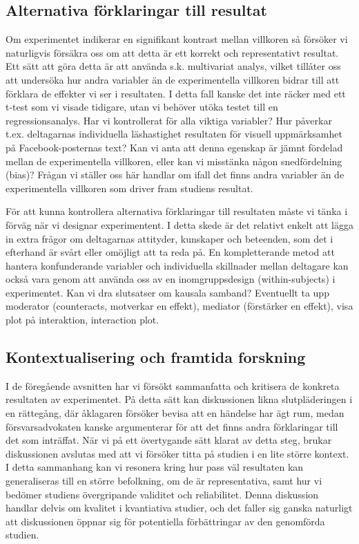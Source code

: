 \documentclass[
]{book}
\begin{document}
\hypertarget{sub08.2.2}{%
\subsection{Alternativa förklaringar till resultat}\label{sub08.2.2}}

Om experimentet indikerar en signifikant kontrast mellan villkoren så försöker vi naturligvis försäkra oss om att detta är ett korrekt och representativt resultat. Ett sätt att göra detta är att använda s.k. multivariat analys, vilket tillåter oss att undersöka hur andra variabler än de experimentella villkoren bidrar till att förklara de effekter vi ser i resultaten. I detta fall kanske det inte räcker med ett t-test som vi visade tidigare, utan vi behöver utöka testet till en regressionsanalys. Har vi kontrollerat för alla viktiga variabler? Hur påverkar t.ex. deltagarnas individuella läshastighet resultaten för visuell uppmärksamhet på Facebook-posternas text? Kan vi anta att denna egenskap är jämnt fördelad mellan de experimentella villkoren, eller kan vi misstänka någon snedfördelning (bias)? Frågan vi ställer oss här handlar om ifall det finns andra variabler än de experimentella villkoren som driver fram studiens resultat.

För att kunna kontrollera alternativa förklaringar till resultaten måste vi tänka i förväg när vi designar experimentent. I detta skede är det relativt enkelt att lägga in extra frågor om deltagarnas attityder, kunskaper och beteenden, som det i efterhand är svårt eller omöjligt att ta reda på. En kompletterande metod att hantera konfunderande variabler och individuella skillnader mellan deltagare kan också vara genom att använda oss av en inomgruppsdesign (within-subjects) i experimentet. Kan vi dra slutsatser om kausala samband? Eventuellt ta upp moderator (counteracts, motverkar en effekt), mediator (förstärker en effekt), visa plot på interaktion, interaction plot.

\hypertarget{sub08.2.3}{%
\subsection{Kontextualisering och framtida forskning}\label{sub08.2.3}}

I de föregående avsnitten har vi försökt sammanfatta och kritisera de konkreta resultaten av experimentet. På detta sätt kan diskussionen likna slutpläderingen i en rättegång, där åklagaren försöker bevisa att en händelse har ägt rum, medan försvarsadvokaten kanske argumenterar för att det finns andra förklaringar till det som inträffat. När vi på ett övertygande sätt klarat av detta steg, brukar diskussionen avslutas med att vi försöker titta på studien i en lite större kontext. I detta sammanhang kan vi resonera kring hur pass väl resultaten kan generaliseras till en större befolkning, om de är representativa, samt hur vi bedömer studiens övergripande validitet och reliabilitet. Denna diskussion handlar delvis om kvalitet i kvantiativa studier, och det faller sig ganska naturligt att diskussionen öppnar sig för potentiella förbättringar av den genomförda studien.
\end{document}
